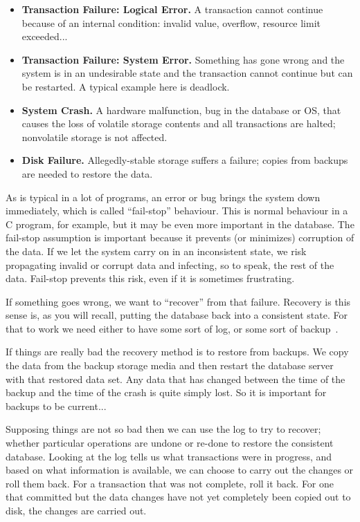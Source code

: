 \documentclass[a4paper]{report}
\begin{document}
\begin{itemize}
	\item \textbf{Transaction Failure: Logical Error.} A transaction cannot continue because of an internal condition: invalid value, overflow, resource limit exceeded...
	\item \textbf{Transaction Failure: System Error.} Something has gone wrong and the system is in an undesirable state and the transaction cannot continue but can be restarted. A typical example here is deadlock.
	\item \textbf{System Crash.} A hardware malfunction, bug in the database or OS, that causes the loss of volatile storage contents and all transactions are halted; nonvolatile storage is not affected.
	\item \textbf{Disk Failure.} Allegedly-stable storage suffers a failure; copies from backups are needed to restore the data.
\end{itemize}

As is typical in a lot of programs, an error or bug brings the system down immediately, which is called ``fail-stop'' behaviour. This is normal behaviour in a C program, for example, but it may be even more important in the database. The fail-stop assumption is important because it prevents (or minimizes) corruption of the data. If we let the system carry on in an inconsistent state, we risk propagating invalid or corrupt data and infecting, so to speak, the rest of the data. Fail-stop prevents this risk, even if it is sometimes frustrating.

If something goes wrong, we want to ``recover'' from that failure. Recovery is this sense is, as you will recall, putting the database back into a consistent state. For that to work we need either to have some sort of log, or some sort of backup~\cite{fds}.

If things are really bad the recovery method is to restore from backups. We copy the data from the backup storage media and then restart the database server with that restored data set. Any data that has changed between the time of the backup and the time of the crash is quite simply lost. So it is important for backups to be current...

Supposing things are not so bad then we can use the log to try to recover; whether particular operations are undone or re-done to restore the consistent database. Looking at the log tells us what transactions were in progress, and based on what information is available, we can choose to carry out the changes or roll them back. For a transaction that was not complete, roll it back. For one that committed but the data changes have not yet completely been copied out to disk,  the changes are carried out.
\end{document}
